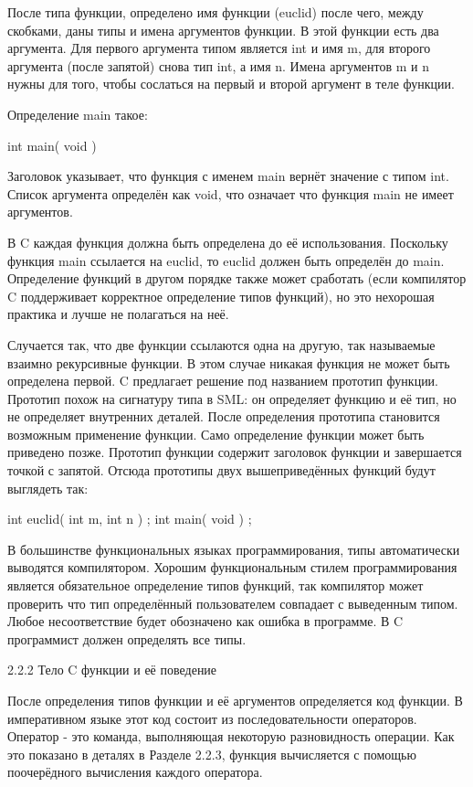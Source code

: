 После типа функции, определено имя функции (euclid) после чего, между скобками, даны типы и имена аргументов функции. В этой функции есть два аргумента. Для первого аргумента типом является int и имя m, для второго аргумента (после запятой) снова тип int, а имя n. Имена аргументов m и n нужны для того, чтобы сослаться на первый и второй аргумент в теле функции.

Определение main такое:

int main( void )

Заголовок указывает, что функция с именем main вернёт значение с типом int. Список аргумента определён как void, что означает что функция main не имеет аргументов.

В C каждая функция должна быть определена до её использования. Поскольку функция main ссылается на euclid, то euclid должен быть определён до main. Определение функций в другом порядке также может сработать (если компилятор C поддерживает корректное определение типов функций), но это нехорошая практика и лучше не полагаться на неё.

Случается так, что две функции ссылаются одна на другую, так называемые взаимно рекурсивные функции. В этом случае никакая функция не может быть определена первой. C предлагает решение под названием прототип функции. Прототип похож на сигнатуру типа в SML: он определяет функцию и её тип, но не определяет внутренних деталей. После определения прототипа становится возможным применение функции. Само определение функции может быть приведено позже. Прототип функции содержит заголовок функции и завершается точкой с запятой. Отсюда прототипы двух вышеприведённых функций будут выглядеть так:

int euclid( int m, int n ) ;
int main( void ) ;

В большинстве функциональных языках программирования, типы автоматически выводятся компилятором. Хорошим функциональным стилем программирования является обязательное определение типов функций, так компилятор может проверить что тип определённый пользователем совпадает с выведенным типом. Любое несоответствие будет обозначено как ошибка в программе. В C программист должен определять все типы.

2.2.2 Тело C функции и её поведение

После определения типов функции и её аргументов определяется код функции. В императивном языке этот код состоит из последовательности операторов. Оператор - это команда, выполняющая некоторую разновидность операции. Как это показано в деталях в Разделе 2.2.3, функция вычисляется с помощью поочерёдного вычисления каждого оператора.

